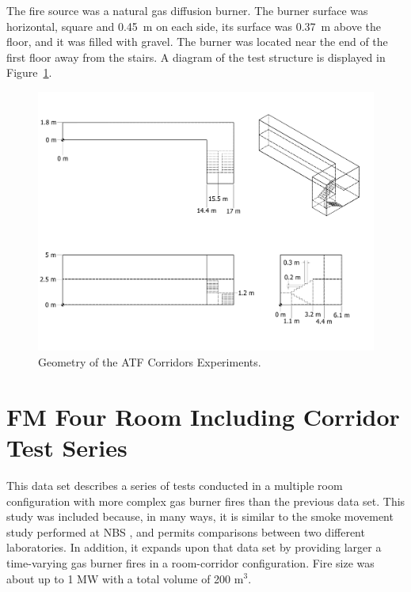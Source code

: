 The fire source was a natural gas diffusion burner.  The burner surface was horizontal, square and 0.45~m on each side, its surface was 0.37~m above the floor, and it was filled with gravel.
The burner was located near the end of the first floor away from the stairs. A diagram of the test structure is displayed in Figure~\ref{ATF Drawing}.


\begin{figure}[h]
\begin{center}
\includegraphics[width=6.5in]{FIGURES/ATF_Corridors/ATF}
\end{center}
\caption{Geometry of the ATF Corridors Experiments.}
\label{ATF Drawing}
\end{figure}

\clearpage

\section{FM Four Room Including Corridor Test Series}

This data set describes a series of tests conducted in a multiple room configuration with more complex gas burner fires than the previous data set.  This study \cite{Heskestad:1986} was included because, in many ways, it is similar to the smoke movement study performed at NBS \cite{Peacock:1988}, and permits comparisons between two different laboratories. In addition, it expands upon that data set by providing larger a time-varying gas burner fires in a room-corridor configuration. Fire size was about up to 1 MW with a total volume of 200 m$^3$.

